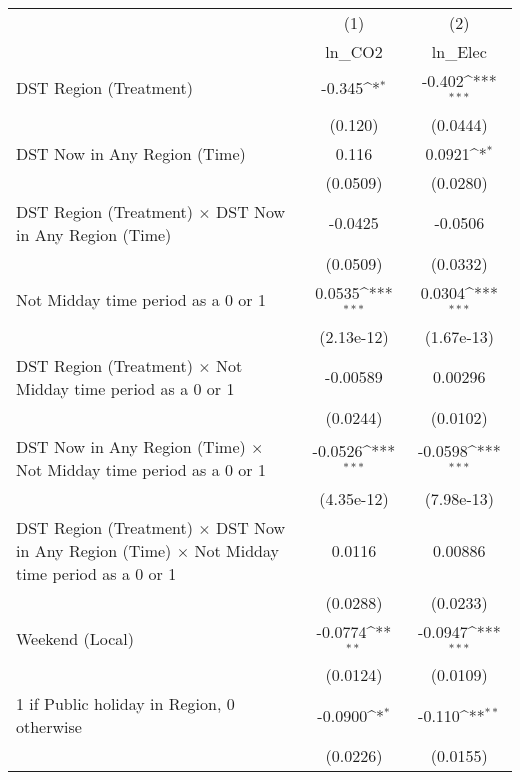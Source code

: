 {
\def\sym#1{\ifmmode^{#1}\else\(^{#1}\)\fi}
\begin{tabular}{l*{2}{c}}
\hline\hline
                    &\multicolumn{1}{c}{(1)}&\multicolumn{1}{c}{(2)}\\
                    &\multicolumn{1}{c}{ln\_CO2}&\multicolumn{1}{c}{ln\_Elec}\\
\hline
DST Region (Treatment)&      -0.345\sym{*}  &      -0.402\sym{***}\\
                    &     (0.120)         &    (0.0444)         \\
[1em]
DST Now in Any Region (Time)&       0.116         &      0.0921\sym{*}  \\
                    &    (0.0509)         &    (0.0280)         \\
[1em]
DST Region (Treatment) $\times$ DST Now in Any Region (Time)&     -0.0425         &     -0.0506         \\
                    &    (0.0509)         &    (0.0332)         \\
[1em]
Not Midday time period as a 0 or 1&      0.0535\sym{***}&      0.0304\sym{***}\\
                    &  (2.13e-12)         &  (1.67e-13)         \\
[1em]
DST Region (Treatment) $\times$ Not Midday time period as a 0 or 1&    -0.00589         &     0.00296         \\
                    &    (0.0244)         &    (0.0102)         \\
[1em]
DST Now in Any Region (Time) $\times$ Not Midday time period as a 0 or 1&     -0.0526\sym{***}&     -0.0598\sym{***}\\
                    &  (4.35e-12)         &  (7.98e-13)         \\
[1em]
DST Region (Treatment) $\times$ DST Now in Any Region (Time) $\times$ Not Midday time period as a 0 or 1&      0.0116         &     0.00886         \\
                    &    (0.0288)         &    (0.0233)         \\
[1em]
Weekend (Local)     &     -0.0774\sym{**} &     -0.0947\sym{***}\\
                    &    (0.0124)         &    (0.0109)         \\
[1em]
1 if Public holiday in Region, 0 otherwise&     -0.0900\sym{*}  &      -0.110\sym{**} \\
                    &    (0.0226)         &    (0.0155)         \\

\end{tabular}}
